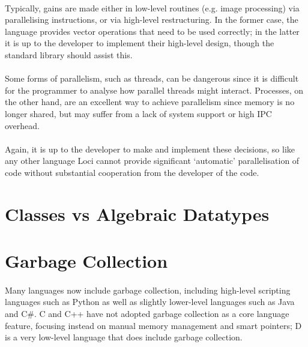 \documentclass[12pt,twoside,notitlepage]{report}
\begin{document}
\paragraph{}
Typically, gains are made either in low-level routines (e.g. image processing) via parallelising instructions, or via high-level restructuring. In the former case, the language provides vector operations that need to be used correctly; in the latter it is up to the developer to implement their high-level design, though the standard library should assist this.

\paragraph{}
Some forms of parallelism, such as threads, can be dangerous since it is difficult for the programmer to analyse how parallel threads might interact. Processes, on the other hand, are an excellent way to achieve parallelism since memory is no longer shared, but may suffer from a lack of system support or high IPC overhead.

\paragraph{}
Again, it is up to the developer to make and implement these decisions, so like any other language Loci cannot provide significant `automatic' parallelisation of code without substantial cooperation from the developer of the code.

\section{Classes vs Algebraic Datatypes}

\paragraph{}


\section{Garbage Collection}

\paragraph{}
Many languages now include garbage collection, including high-level scripting languages such as Python as well as slightly lower-level languages such as Java and C\#. C and C++ have not adopted garbage collection as a core language feature, focusing instead on manual memory management and smart pointers; D is a very low-level language that does include garbage collection.
\end{document}
